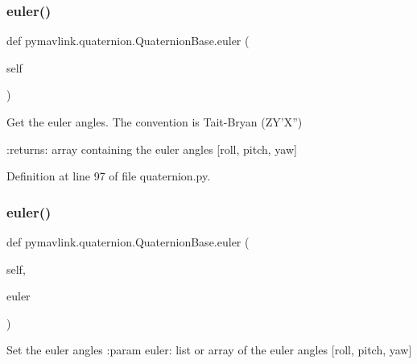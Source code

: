 \mbox{\label{classpymavlink_1_1quaternion_1_1QuaternionBase_a05ce9891b63e3b83fc52521581ddba5e}} 
\subsubsection{\texorpdfstring{euler()}{euler()}\hspace{0.1cm}{\footnotesize\ttfamily [1/2]}}
{\footnotesize\ttfamily def pymavlink.\+quaternion.\+Quaternion\+Base.\+euler (\begin{DoxyParamCaption}\item[{}]{self }\end{DoxyParamCaption})}

\begin{DoxyVerb}Get the euler angles.
The convention is Tait-Bryan (ZY'X'')

:returns: array containing the euler angles [roll, pitch, yaw]
\end{DoxyVerb}
 

Definition at line 97 of file quaternion.\+py.

\mbox{\label{classpymavlink_1_1quaternion_1_1QuaternionBase_a3bc9e70528ac1880ec02a69c9fe86c26}} 
\subsubsection{\texorpdfstring{euler()}{euler()}\hspace{0.1cm}{\footnotesize\ttfamily [2/2]}}
{\footnotesize\ttfamily def pymavlink.\+quaternion.\+Quaternion\+Base.\+euler (\begin{DoxyParamCaption}\item[{}]{self,  }\item[{}]{euler }\end{DoxyParamCaption})}

\begin{DoxyVerb}Set the euler angles
:param euler: list or array of the euler angles [roll, pitch, yaw]\end{DoxyVerb}
 

